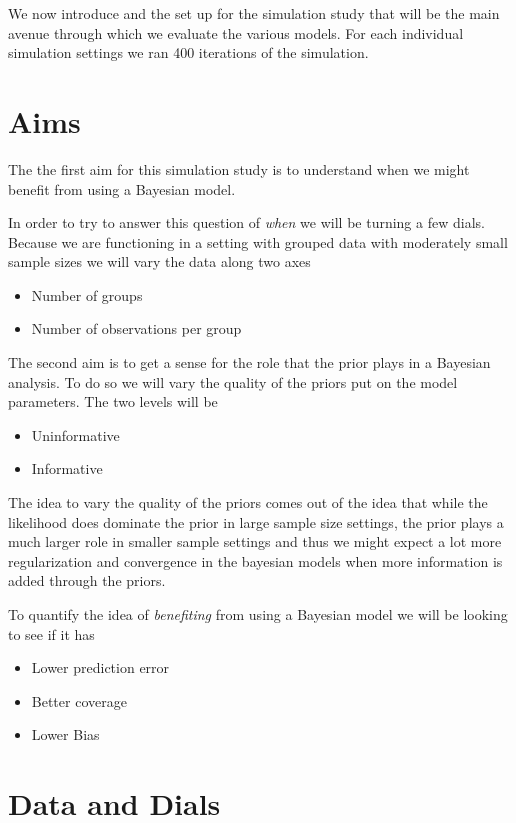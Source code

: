 \documentclass[12pt,twoside]{reedthesis}
\providecommand{\tightlist}{%
  \setlength{\itemsep}{0pt}\setlength{\parskip}{0pt}}
\begin{document}
We now introduce and the set up for the simulation study that will be the main avenue through which we evaluate the various models. For each individual simulation settings we ran 400 iterations of the simulation.

\hypertarget{aims}{%
\section{Aims}\label{aims}}

The the first aim for this simulation study is to understand when we might benefit from using a Bayesian model.

In order to try to answer this question of \emph{when} we will be turning a few dials. Because we are functioning in a setting with grouped data with moderately small sample sizes we will vary the data along two axes
\begin{itemize}
\tightlist
\item
  Number of groups
\item
  Number of observations per group
\end{itemize}
The second aim is to get a sense for the role that the prior plays in a Bayesian analysis. To do so we will vary the quality of the priors put on the model parameters. The two levels will be
\begin{itemize}
\tightlist
\item
  Uninformative
\item
  Informative
\end{itemize}
The idea to vary the quality of the priors comes out of the idea that while the likelihood does dominate the prior in large sample size settings, the prior plays a much larger role in smaller sample settings and thus we might expect a lot more regularization and convergence in the bayesian models when more information is added through the priors.

To quantify the idea of \emph{benefiting} from using a Bayesian model we will be looking to see if it has
\begin{itemize}
\tightlist
\item
  Lower prediction error
\item
  Better coverage
\item
  Lower Bias
\end{itemize}
\hypertarget{data-and-dials}{%
\section{Data and Dials}\label{data-and-dials}}
\end{document}
